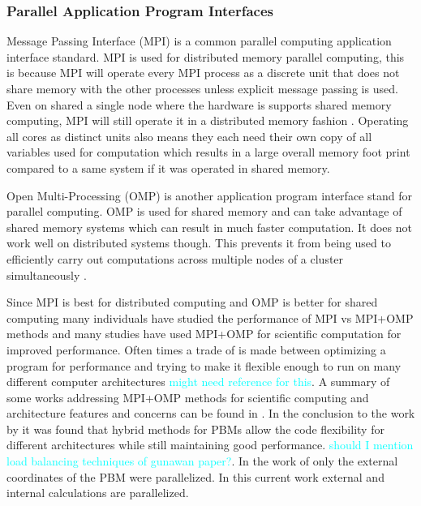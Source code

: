 \documentclass[preprint,11pt,authoryear]{elsarticle}
\begin{document}
    \subsubsection{Parallel Application Program Interfaces}
    \par Message Passing Interface (MPI) is a common parallel computing application interface standard. MPI is used for distributed memory parallel computing, this is because MPI will operate every MPI process as a discrete unit that does not share memory with the other processes unless explicit message passing is used. Even on shared a single node where the hardware is supports shared memory computing, MPI will still operate it in a distributed memory fashion \cite{Jin2011}. Operating all cores as distinct units also means they each need their own copy of all variables used for computation which results in a large overall memory foot print compared to a same system if it was operated in shared memory. 
    \par Open Multi-Processing (OMP) is another application program interface stand for parallel computing. OMP is used for shared memory and can take advantage of shared memory systems which can result in much faster computation. It does not work well on distributed systems though. This prevents it from being used to efficiently carry out computations across multiple nodes of a cluster simultaneously \cite{Jin2011}. 
    \par Since MPI is best for distributed computing and OMP is better for shared computing many individuals have studied the performance of MPI vs MPI+OMP methods and many studies have used MPI+OMP for scientific computation for improved performance. Often times a trade of is made between optimizing a program for performance and trying to make it flexible enough to run on many different computer architectures \textcolor{cyan}{might need reference for this}. A summary of some works addressing MPI+OMP methods for scientific computing and architecture features and concerns can be found in \cite{Bettencourt2017}. In the conclusion to the work by \cite{Bettencourt2017} it was found that hybrid methods for PBMs allow the code flexibility for different architectures while still maintaining good performance. \textcolor{cyan}{should I mention load balancing techniques of gunawan paper?}. In the work of \cite{Bettencourt2017} only the external coordinates of the PBM were parallelized. In this current work external and internal calculations are parallelized. 
      
\end{document}
